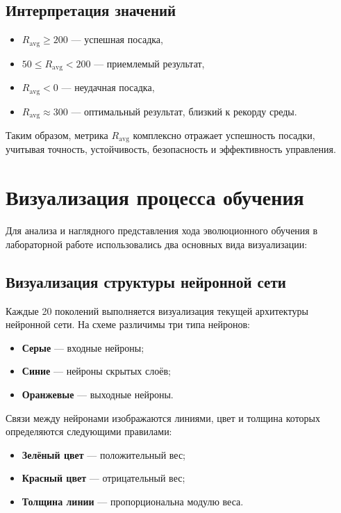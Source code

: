 \documentclass[a4paper,12pt]{article}
\begin{document}
\subsection{Интерпретация значений}
\begin{itemize}
    \item $R_{\text{avg}} \geq 200$ — успешная посадка,
    \item $50 \leq R_{\text{avg}} < 200$ — приемлемый результат,
    \item $R_{\text{avg}} < 0$ — неудачная посадка,
    \item $R_{\text{avg}} \approx 300$ — оптимальный результат, близкий к рекорду среды.
\end{itemize}


Таким образом, метрика $R_{\text{avg}}$ комплексно отражает успешность посадки, учитывая точность, устойчивость, безопасность и эффективность управления.




\newpage


\section{Визуализация процесса обучения}

Для анализа и наглядного представления хода эволюционного обучения в лабораторной работе использовались два основных вида визуализации:

\subsection{Визуализация структуры нейронной сети}

Каждые 20 поколений выполняется визуализация текущей архитектуры нейронной сети. На схеме различимы три типа нейронов:
\begin{itemize}
    \item \textbf{Серые} — входные нейроны;
    \item \textbf{Синие} — нейроны скрытых слоёв;
    \item \textbf{Оранжевые} — выходные нейроны.
\end{itemize}

Связи между нейронами изображаются линиями, цвет и толщина которых определяются следующими правилами:
\begin{itemize}
    \item \textbf{Зелёный цвет} — положительный вес;
    \item \textbf{Красный цвет} — отрицательный вес;
    \item \textbf{Толщина линии} — пропорциональна модулю веса.
\end{itemize}
\end{document}
